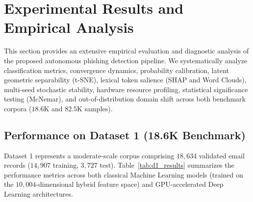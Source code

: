 \documentclass[conference]{IEEEtran}
\begin{document}
\section{Experimental Results and Empirical Analysis}
\label{sec:results}

This section provides an extensive empirical evaluation and diagnostic analysis of the proposed autonomous phishing detection pipeline. We systematically analyze classification metrics, convergence dynamics, probability calibration, latent geometric separability (t-SNE), lexical token salience (SHAP and Word Clouds), multi-seed stochastic stability, hardware resource profiling, statistical significance testing (McNemar), and out-of-distribution domain shift across both benchmark corpora ($18.6\text{K}$ and $82.5\text{K}$ samples).

\subsection{Performance on Dataset 1 (18.6K Benchmark)}
\label{subsec:d1_results}
Dataset 1 represents a moderate-scale corpus comprising $18,634$ validated email records ($14,907$ training, $3,727$ test). Table~\ref{tab:d1_results} summarizes the performance metrics across both classical Machine Learning models (trained on the $10,004$-dimensional hybrid feature space) and GPU-accelerated Deep Learning architectures.
\end{document}
